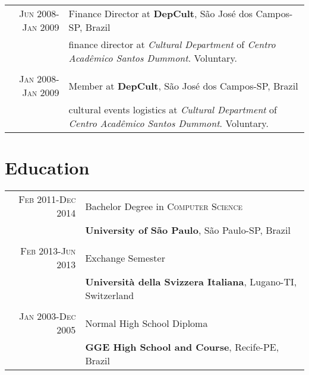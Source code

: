 \documentclass[a4paper,10pt]{article} %
\begin{document}
\begin{tabular}{r|p{11cm}}

\textsc{Jun 2008-Jan 2009} & Finance Director at \textbf{DepCult}, São José dos Campos-SP, Brazil \emph{}\\
& \footnotesize{finance director at \emph{Cultural Department} of 
       \emph{Centro Acad\^{e}mico Santos Dummont}. Voluntary.}\\
\multicolumn{2}{c}{}\\



\textsc{Jan 2008-Jan 2009} & Member at \textbf{DepCult}, São José dos Campos-SP, Brazil \emph{}\\
& \footnotesize{cultural events logistics at \emph{Cultural Department} of \emph{Centro Acad\^{e}mico Santos Dummont}. Voluntary.}\\

\end{tabular}



\section{Education}

\begin{tabular}{r|p{11cm}}
\textsc{Feb} 2011-\textsc{Dec} 2014& Bachelor Degree in \textsc{}\textsc{Computer Science} \\& \normalsize\textbf{University of São Paulo}, São Paulo-SP, Brazil\\
\multicolumn{2}{c}{}\\


\textsc{Feb} 2013-\textsc{Jun} 2013& Exchange Semester\\
    & \textbf{Università della Svizzera Italiana}, Lugano-TI, Switzerland\\
\multicolumn{2}{c}{}\\
    

\textsc{Jan} 2003-\textsc{Dec} 2005& Normal High School Diploma\\
  & \textbf{GGE High School and Course}, Recife-PE, Brazil
\end{tabular}
\end{document}
